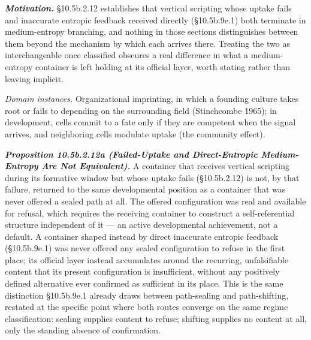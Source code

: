 \documentclass[
]{article}
\begin{document}
\emph{\textbf{Motivation.}} §10.5b.2.12 establishes that vertical
scripting whose uptake fails and inaccurate entropic feedback received
directly (§10.5b.9e.1) both terminate in medium-entropy branching, and
nothing in those sections distinguishes between them beyond the
mechanism by which each arrives there. Treating the two as
interchangeable once classified obscures a real difference in what a
medium-entropy container is left holding at its official layer, worth
stating rather than leaving implicit.

\emph{Domain instances.} Organizational imprinting, in which a founding
culture takes root or fails to depending on the surrounding field
(Stinchcombe 1965); in development, cells commit to a fate only if they
are competent when the signal arrives, and neighboring cells modulate
uptake (the community effect).

\emph{\textbf{Proposition 10.5b.2.12a (Failed-Uptake and Direct-Entropic
Medium-Entropy Are Not Equivalent).}} A container that receives vertical
scripting during its formative window but whose uptake fails
(§10.5b.2.12) is not, by that failure, returned to the same
developmental position as a container that was never offered a sealed
path at all. The offered configuration was real and available for
refusal, which requires the receiving container to construct a
self-referential structure independent of it --- an active developmental
achievement, not a default. A container shaped instead by direct
inaccurate entropic feedback (§10.5b.9e.1) was never offered any sealed
configuration to refuse in the first place; its official layer instead
accumulates around the recurring, unfalsifiable content that its present
configuration is insufficient, without any positively defined
alternative ever confirmed as sufficient in its place. This is the same
distinction §10.5b.9e.1 already draws between path-sealing and
path-shifting, restated at the specific point where both routes converge
on the same regime classification: sealing supplies content to refuse;
shifting supplies no content at all, only the standing absence of
confirmation.
\end{document}
